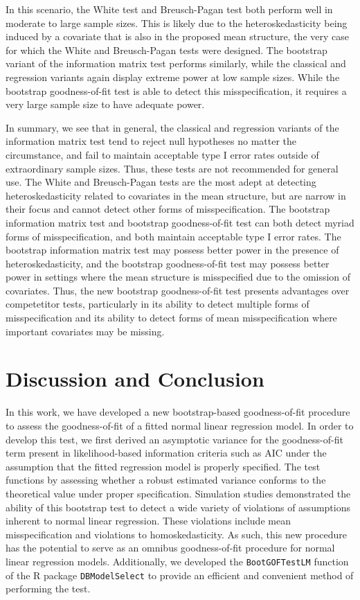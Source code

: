 \documentclass[review]{elsarticle}
\begin{document}
In this scenario, the White test and Breusch-Pagan test both perform well in moderate to large sample sizes. This is likely due to the heteroskedasticity being induced by a covariate that is also in the 
proposed mean structure, the very case for which the White and Breusch-Pagan tests were designed. The bootstrap variant of the information matrix test performs similarly, while the classical and regression
variants again display extreme power at low sample sizes. While the bootstrap goodness-of-fit test is able to detect this misspecification, it requires a very large sample size to have adequate power.

In summary, we see that in general, the classical and regression variants of the information matrix test tend to reject null hypotheses no matter the circumstance, and fail to maintain acceptable type I error rates outside of extraordinary sample sizes. Thus, these tests are not recommended for general use. The White and Breusch-Pagan tests are the most adept at detecting heteroskedasticity related to covariates in the mean structure, but are narrow in their focus and cannot detect other forms of misspecification. The bootstrap information matrix test and bootstrap goodness-of-fit test can both detect myriad forms of misspecification, and both maintain acceptable type I error rates. The bootstrap information matrix test may possess better power in the presence of heteroskedasticity, and the bootstrap goodness-of-fit test may possess better power in settings where the mean structure is misspecified due to the omission of covariates. Thus, the new bootstrap goodness-of-fit test presents advantages over competetitor tests, particularly in its ability to detect multiple forms of misspecification and its ability to detect forms of mean misspecification where important covariates may be missing.

\section{Discussion and Conclusion}

In this work, we have developed a new bootstrap-based goodness-of-fit procedure to assess the goodness-of-fit of a fitted normal linear regression model. In order
to develop this test, we first derived an asymptotic variance for the goodness-of-fit term present in likelihood-based information criteria such as AIC under the assumption
that the fitted regression model is properly specified. The test functions by assessing whether a robust estimated variance conforms to the
theoretical value under proper specification. Simulation studies demonstrated the ability of this bootstrap test to detect a wide variety of violations of assumptions inherent to
normal linear regression. These violations include mean misspecification and violations to homoskedasticity. As such, this new procedure has the potential to serve as an omnibus
goodness-of-fit procedure for normal linear regression models. Additionally, we developed the \texttt{BootGOFTestLM} function of the R package \texttt{DBModelSelect} to provide
an efficient and convenient method of performing the test.
\end{document}
